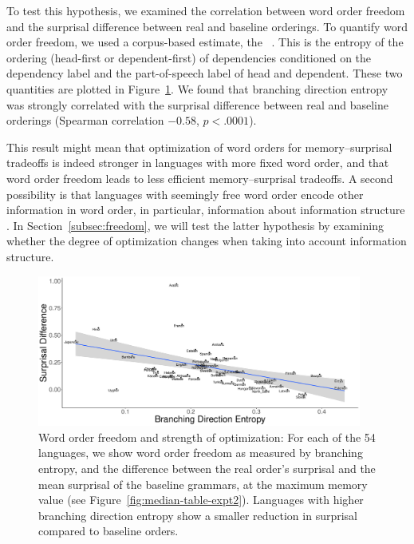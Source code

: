To test this hypothesis, we examined the correlation between word order freedom and the surprisal difference between real and baseline orderings.
To quantify word order freedom, we used a corpus-based estimate, the ~\citep{futrell-quantifying-2015}.
This is the entropy of the ordering (head-first or dependent-first) of dependencies conditioned on the dependency label and the part-of-speech label of head and dependent.
These two quantities are plotted in Figure~\ref{fig:freedom-surp}.
We found that branching direction entropy was strongly correlated with the surprisal difference between real and baseline orderings (Spearman correlation $-0.58$, $p < .0001$).

This result might mean that optimization of word orders for memory--surprisal tradeoffs is indeed stronger in languages with more fixed word order, and that word order freedom leads to less efficient memory--surprisal tradeoffs.
A second possibility is that languages with seemingly free word order encode other information in word order, in particular, information about information structure \citep[e.g.][]{givon1988pragmatics,firbas1966defining,firbas1974aspects,myhill1985pragmatic}.
In Section~\ref{subsec:freedom}, we will test the latter hypothesis by examining whether the degree of optimization changes when taking into account information structure.




\begin{figure}
\includegraphics[width=0.95\textwidth]{figures/surprisal-branching-entropy-REAL-invert.pdf}
	\caption{Word order freedom and strength of optimization: For each of the 54 languages, we show word order freedom as measured by branching entropy, and the difference between the real order's surprisal and the mean surprisal of the baseline grammars, at the maximum memory value (see Figure~\ref{fig:median-table-expt2}).
	Languages with higher branching direction entropy show a smaller reduction in surprisal compared to baseline orders.%
	}\label{fig:freedom-surp}
\end{figure}


